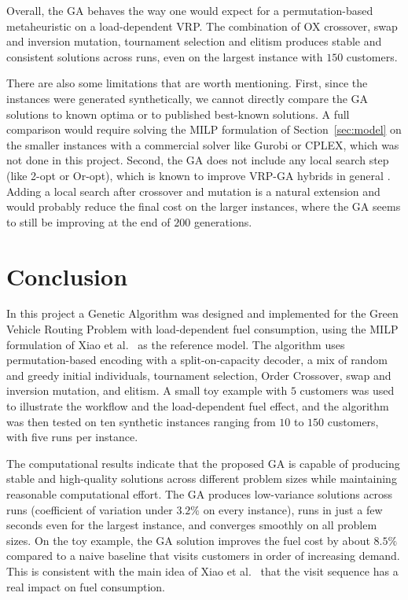 \documentclass [a4paper, 11pt, titlepage] {article}
\begin{document}
Overall, the GA behaves the way one would expect for a permutation-based metaheuristic on a load-dependent VRP. The combination of OX crossover, swap and inversion mutation, tournament selection and elitism produces stable and consistent solutions across runs, even on the largest instance with $150$ customers.

There are also some limitations that are worth mentioning. First, since the instances were generated synthetically, we cannot directly compare the GA solutions to known optima or to published best-known solutions. A full comparison would require solving the MILP formulation of Section~\ref{sec:model} on the smaller instances with a commercial solver like Gurobi or CPLEX, which was not done in this project. Second, the GA does not include any local search step (like 2-opt or Or-opt), which is known to improve VRP-GA hybrids in general \cite{vidal2020}. Adding a local search after crossover and mutation is a natural extension and would probably reduce the final cost on the larger instances, where the GA seems to still be improving at the end of $200$ generations.


\section{Conclusion}
\label{sec:conclusion}

In this project a Genetic Algorithm was designed and implemented for the Green Vehicle Routing Problem with load-dependent fuel consumption, using the MILP formulation of Xiao et al.\ \cite{xiao2012} as the reference model. The algorithm uses permutation-based encoding with a split-on-capacity decoder, a mix of random and greedy initial individuals, tournament selection, Order Crossover, swap and inversion mutation, and elitism. A small toy example with $5$ customers was used to illustrate the workflow and the load-dependent fuel effect, and the algorithm was then tested on ten synthetic instances ranging from $10$ to $150$ customers, with five runs per instance.

The computational results indicate that the proposed GA is capable of producing stable and high-quality solutions across different problem sizes while maintaining reasonable computational effort. The GA produces low-variance solutions across runs (coefficient of variation under $3.2\%$ on every instance), runs in just a few seconds even for the largest instance, and converges smoothly on all problem sizes. On the toy example, the GA solution improves the fuel cost by about $8.5\%$ compared to a naive baseline that visits customers in order of increasing demand. This is consistent with the main idea of Xiao et al.\ \cite{xiao2012} that the visit sequence has a real impact on fuel consumption.
\end{document}
